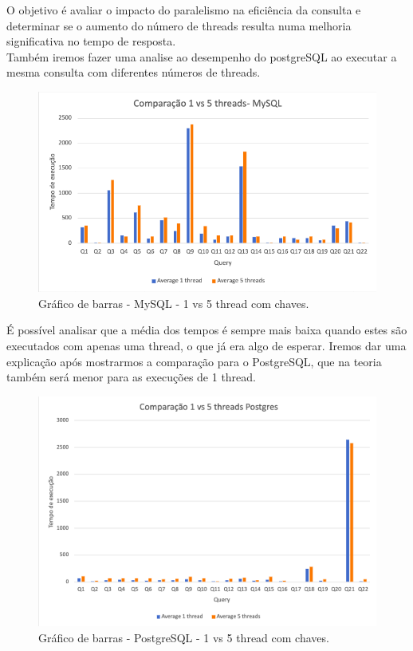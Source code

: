 \documentclass{article}
\begin{document}
  O objetivo é avaliar o impacto do paralelismo na eficiência da consulta e determinar se o aumento do número de threads resulta numa melhoria significativa no tempo de resposta.\\
  
  Também iremos fazer uma analise ao desempenho do postgreSQL ao executar a mesma consulta com diferentes números de threads.

  \begin{figure}[H]
    \centering
    \includegraphics[width=\textwidth]{Graphs/comparationThreadsMySQL.png}
    \caption{Gráfico de barras - MySQL - 1 vs 5 thread com chaves.} 
    \label{fig:PKCreation2}

  \end{figure}

  \quad É possível analisar que a média dos tempos é sempre mais baixa quando estes são executados com apenas uma thread, o que já era algo de esperar. Iremos dar uma explicação após mostrarmos a comparação para o PostgreSQL, que na teoria também será menor para as execuções de 1 thread.

  \begin{figure}[H]
    \centering
    \includegraphics[width=\textwidth]{Graphs/ComparationPostgres.png}
    \caption{Gráfico de barras - PostgreSQL - 1 vs 5 thread com chaves.} 
    \label{fig:PKCreation2}
  \end{figure}
\end{document}
